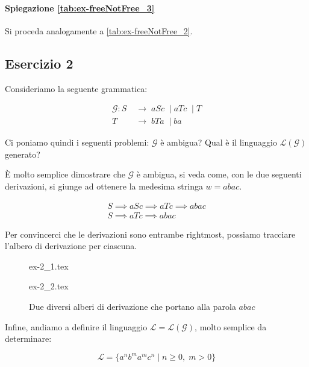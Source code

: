 \documentclass[class=book, crop=false, oneside, 12pt]{standalone}
\begin{document}
\paragraph{Spiegazione \ref{tab:ex-freeNotFree_3}}
Si proceda analogamente a \ref{tab:ex-freeNotFree_2}.

\subsection*{Esercizio 2}
Consideriamo la seguente grammatica:

\begin{align*}
  \mathcal{G}:  S\; & \to\;  aSc\; \mid aTc\; \mid T \\
   T\; & \to\; bTa\; \mid ba
\end{align*}

\noindent Ci poniamo quindi i seguenti problemi: \(\mathcal{G}\) è ambigua? Qual è il linguaggio \(\mathcal{L(G)}\) generato?

È molto semplice dimostrare che \(\mathcal{G}\) è ambigua, si veda come, con le due seguenti derivazioni, si giunge ad ottenere la medesima stringa \(w = abac\).

\begin{gather*}
  S \implies aSc \implies aTc \implies abac \\
  S \implies aTc \implies abac
\end{gather*}

\noindent Per convincerci che le derivazioni sono entrambe rightmost, possiamo tracciare l'albero di derivazione per ciascuna.

\begin{figure}[H]
  \begin{minipage}{0.5\textwidth}
    \centering
    {ex-2_1.tex}
    \label{fig:ex-2_1}
  \end{minipage}
  \begin{minipage}{0.5\textwidth}
    \centering
    {ex-2_2.tex}
    \label{fig:ex-2_2}
  \end{minipage}
  \caption{Due diversi alberi di derivazione che portano alla parola \(abac\)}
  \label{fig:ex-2}
\end{figure}

\noindent Infine, andiamo a definire il linguaggio \(\mathcal{L = L(G)}\), molto semplice da determinare:

\begin{equation*}
  \mathcal{L} = \{ a^n b^m a^m c^n \mid n \geq 0,\; m > 0 \}
\end{equation*}
\end{document}

